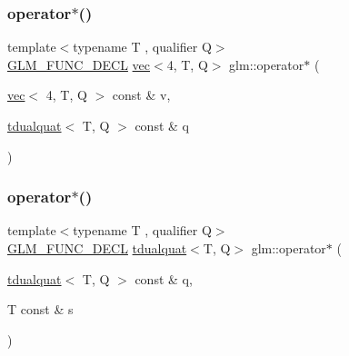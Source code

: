 \mbox{\label{group__gtx__dual__quaternion_ga9fd4e646fe49daed7aabbf0cb8736685}} 
\subsubsection{\texorpdfstring{operator$\ast$()}{operator*()}\hspace{0.1cm}{\footnotesize\ttfamily [5/7]}}
{\footnotesize\ttfamily template$<$typename T , qualifier Q$>$ \\
\hyperlink{setup_8hpp_ab2d052de21a70539923e9bcbf6e83a51}{G\+L\+M\+\_\+\+F\+U\+N\+C\+\_\+\+D\+E\+CL} \hyperlink{structglm_1_1vec}{vec}$<$4, T, Q$>$ glm\+::operator$\ast$ (\begin{DoxyParamCaption}\item[{\hyperlink{structglm_1_1vec}{vec}$<$ 4, T, Q $>$ const \&}]{v,  }\item[{\hyperlink{structglm_1_1tdualquat}{tdualquat}$<$ T, Q $>$ const \&}]{q }\end{DoxyParamCaption})}

\mbox{\label{group__gtx__dual__quaternion_ga03c35eae969f074f10fa2bf473670ad7}} 
\subsubsection{\texorpdfstring{operator$\ast$()}{operator*()}\hspace{0.1cm}{\footnotesize\ttfamily [6/7]}}
{\footnotesize\ttfamily template$<$typename T , qualifier Q$>$ \\
\hyperlink{setup_8hpp_ab2d052de21a70539923e9bcbf6e83a51}{G\+L\+M\+\_\+\+F\+U\+N\+C\+\_\+\+D\+E\+CL} \hyperlink{structglm_1_1tdualquat}{tdualquat}$<$T, Q$>$ glm\+::operator$\ast$ (\begin{DoxyParamCaption}\item[{\hyperlink{structglm_1_1tdualquat}{tdualquat}$<$ T, Q $>$ const \&}]{q,  }\item[{T const \&}]{s }\end{DoxyParamCaption})}

